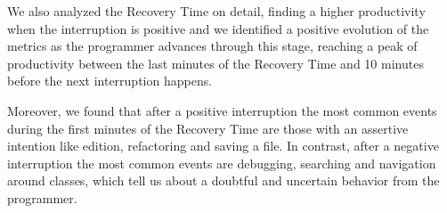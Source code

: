 \documentclass[times]{smrauth}
\begin{document}
We also analyzed the Recovery Time on detail, finding a higher productivity when the interruption is positive and we identified a positive evolution of the metrics as the programmer advances through this stage, reaching a peak of productivity between the last minutes of the Recovery Time and 10 minutes before the next interruption happens.  

Moreover, we found that after a positive interruption the most common events during the first minutes of the Recovery Time are those with an assertive intention like edition, refactoring and saving a file. In contrast, after a negative interruption the most common events are debugging, searching and navigation around classes, which tell us about a doubtful and uncertain behavior from the programmer.









\end{document}
